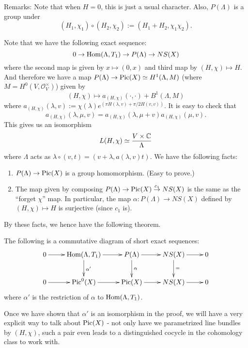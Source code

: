Remarks: Note that when $H=0$, this is just a usual character. Also, $P(\Lambda)$ is a group under
$$(H_1,\chi_1)\circ (H_2,\chi_2):=(H_1+H_2,\chi_1\chi_2).$$

Note that we have the following exact sequence:
$$0\to \operatorname{Hom}(\Lambda,T_1)\to P(\Lambda)\to NS(X)$$
where the second map is given by $x\mapsto (0,x)$ and third map by $(H,\chi)\mapsto H$. And therefore we have a map $P(\Lambda)\to \operatorname{Pic}(X)\simeq H^1(\Lambda,M)$ (where $M=H^0(V,\mathcal{O}^\times_V)$) given by
$$(H,\chi)\mapsto a_{(H,\chi)}(\cdot,\cdot)+B^1(\Lambda,M)$$
where $a_{(H,\chi)}(\lambda,v):=\chi(\lambda)e^{(\pi H(\lambda,v)+\pi/2 H(v,v))}$. It is easy to check that 
$$a_{(H,\chi)}(\lambda,\mu,v)=a_{(H,\chi)}(\lambda,\mu+v)a_{(H,\chi)}(\mu,v).$$ 
This gives us an isomorphism 
$$L(H,\chi)\simeq \frac{V\times {\mathbb C}}{\Lambda}$$
where $\Lambda$ acts as $\lambda\circ (v,t)=(v+\lambda,a(\lambda,v)t)$. We have the following facts:

\begin{enumerate}
\item $P(\Lambda)\to \operatorname{Pic}(X)$ is a group homomorphism. (Easy to prove.)
\item The map given by composing $P(\Lambda)\to \operatorname{Pic}(X) \overset{c_1}{\to} NS(X)$ is the same as the ``forget $\chi$'' map. In particular, the map $\alpha:P(\Lambda)\to NS(X)$ defined by $(H,\chi)\mapsto H$ is surjective (since $c_1$ is). 
\end{enumerate}

By these facts, we hence have the following theorem.

\begin{theorem}
The following is a commutative diagram of short exact sequences:
\[
\xymatrix{
0 \ar[r] &\Hom(\Lambda,T_1) \ar[r] \ar[d]^{\alpha'} &P(\Lambda) \ar[r] \ar[d]^{\alpha} &NS(X) \ar[r] \ar[d]^= &0\\
0 \ar[r] &\Pic^0(X) \ar[r] &\Pic(X) \ar[r] &NS(X) \ar[r] &0
}
\]
where $\alpha'$ is the restriction of $\alpha$ to $\operatorname{Hom}(\Lambda,T_1)$. 
\end{theorem}

Once we have shown that $\alpha'$ is an isomorphism in the proof, we will have a very explicit way to talk about $\operatorname{Pic}(X)$ - not only have we parametrized line bundles by $(H,\chi)$, such a pair even leads to a distinguished cocycle in the cohomology class to work with.



